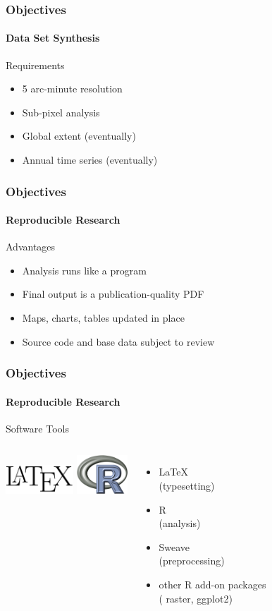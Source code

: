 \documentclass{beamer}
\begin{document}
\begin{frame}
  \frametitle{Objectives}
  \framesubtitle{Data Set Synthesis}
  Requirements
  \begin{itemize}
  \item 
    5 arc-minute resolution
    \pause
  \item 
    Sub-pixel analysis
    \pause
  \item 
    Global extent (eventually)
    \pause
  \item 
    Annual time series (eventually)
  \end{itemize}
\end{frame}


\begin{frame}
  \frametitle{Objectives}
  \framesubtitle{Reproducible Research}
  Advantages
  \begin{itemize}
  \item 
    Analysis runs like a program
    \pause
  \item 
    Final output is a publication-quality PDF
    \pause
  \item 
    Maps, charts, tables updated in place
    \pause
  \item 
    Source code and base data subject to review
  \end{itemize}
\end{frame}


\begin{frame}
  \frametitle{Objectives}
  \framesubtitle{Reproducible Research}
  Software Tools
  \begin{columns}[c]
    \column{1.0in}
    \includegraphics[width=1.0in]{latex}
    \vspace{0.5in}
    \includegraphics[width=0.75in]{r}
    \column{2.0in}  
    \begin{itemize}
    \item 
      \LaTeX \\ (typesetting)
      \pause
    \item 
      R \\ (analysis) 
      \pause
    \item 
      Sweave \\ (preprocessing)
      \pause
    \item 
      other R add-on packages \\
      ( raster, ggplot2)
    \end{itemize}
  \end{columns}
\end{frame}
\end{document}
